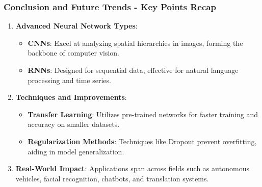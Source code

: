 \documentclass{beamer}
\begin{document}
\begin{frame}[fragile]
    \frametitle{Conclusion and Future Trends - Key Points Recap}
    
    \begin{enumerate}
        \item \textbf{Advanced Neural Network Types}:
        \begin{itemize}
            \item \textbf{CNNs}: Excel at analyzing spatial hierarchies in images, forming the backbone of computer vision.
            \item \textbf{RNNs}: Designed for sequential data, effective for natural language processing and time series.
        \end{itemize}
        
        \item \textbf{Techniques and Improvements}:
        \begin{itemize}
            \item \textbf{Transfer Learning}: Utilizes pre-trained networks for faster training and accuracy on smaller datasets.
            \item \textbf{Regularization Methods}: Techniques like Dropout prevent overfitting, aiding in model generalization.
        \end{itemize}
        
        \item \textbf{Real-World Impact}: Applications span across fields such as autonomous vehicles, facial recognition, chatbots, and translation systems.
    \end{enumerate}
\end{frame}
\end{document}
